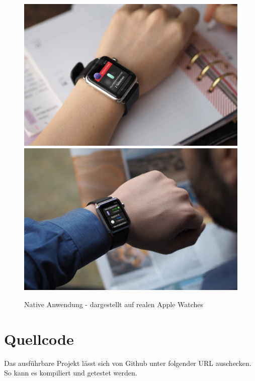 \begin{figure}
	\caption{Native Anwendung - dargestellt auf realen Apple Watches}
	\label{fig:watch-real}
	\centering
	\includegraphics[width=1\textwidth]{04_realisation/screenshots/Mockup-Generated-by-Dunnnk.jpg}
	\includegraphics[width=1\textwidth]{04_realisation/screenshots/Mockup-Generated-by-Dunnnk-2.jpg}
	\end{figure}
\section{Quellcode}
Das ausführbare Projekt lässt sich von Github unter folgender URL\cite{Schmidt:repoCode} auschecken. So kann es kompiliert und getestet werden. 

